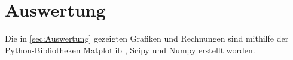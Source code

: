 \section{Auswertung}
\label{sec:Auswertung}
Die in \autoref{sec:Auswertung} gezeigten Grafiken und Rechnungen sind mithilfe der Python-Bibliotheken Matplotlib \cite{matplotlib}, Scipy \cite{scipy} und Numpy \cite{numpy}
erstellt worden.

\subsubsection{}
\begin{table}[H]
  \centering
  \caption{}
  \label{tab:}
\end{table}

